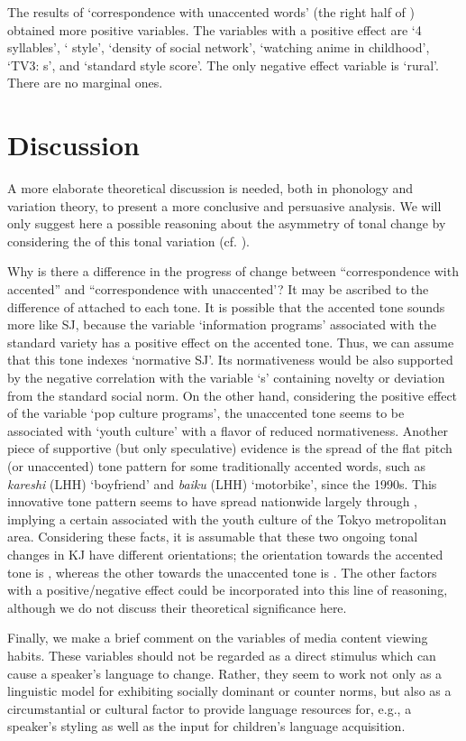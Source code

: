 \documentclass[output=paper]{LSP/langsci}
\begin{document}
The results of  ‘correspondence with unaccented words’ (the right half of ) obtained more positive variables. The variables with a positive effect are ‘4 syllables’, ‘ style’, ‘density of social network’, ‘watching anime in childhood’, ‘TV3: s’, and ‘standard style score’. The only negative effect variable is ‘rural’. There are no marginal ones.

\section{Discussion}
A more elaborate theoretical discussion is needed, both in phonology and variation theory, to present a more conclusive and persuasive analysis. We will only suggest here a possible reasoning about the asymmetry of tonal change by considering the  of this tonal variation (cf. \citealt{eckert_variation_2008}). 

Why is there a difference in the progress of change between ``correspondence with accented'' and ``correspondence with unaccented'? It may be ascribed to the difference of  attached to each tone. It is possible that the accented tone sounds more like SJ, because the variable `information programs' associated with the standard variety has a positive effect on the accented tone. Thus, we can assume that this tone indexes `normative SJ'. Its normativeness would be also supported by the negative correlation with the variable `s' containing novelty or deviation from the standard social norm. On the other hand, considering the positive effect of the variable `pop culture programs', the unaccented tone seems to be associated with `youth culture' with a flavor of reduced normativeness. Another piece of supportive (but only speculative) evidence is the spread of the flat pitch (or unaccented) tone pattern for some traditionally accented words, such as \textit{kareshi }(LHH) `boyfriend' and \textit{baiku} (LHH) `motorbike', since the 1990s. This innovative tone pattern seems to have spread nationwide largely through , implying a certain  associated with the youth culture of the Tokyo metropolitan area. Considering these facts, it is assumable that these two ongoing tonal changes in KJ have different orientations; the orientation towards the accented tone is , whereas the other towards the unaccented tone is . The other factors with a positive/negative effect could be incorporated into this line of reasoning, although we do not discuss their theoretical significance here.

Finally, we make a brief comment on the variables of media content viewing habits. These variables should not be regarded as a direct stimulus which can cause a speaker’s language to change. Rather, they seem to work not only as a linguistic model for exhibiting socially dominant or counter norms, but also as a circumstantial or cultural factor to provide language resources for, e.g., a speaker’s styling as well as the input for children’s language acquisition.
     
\printbibliography[heading=subbibliography,notkeyword=this]
\end{document}
